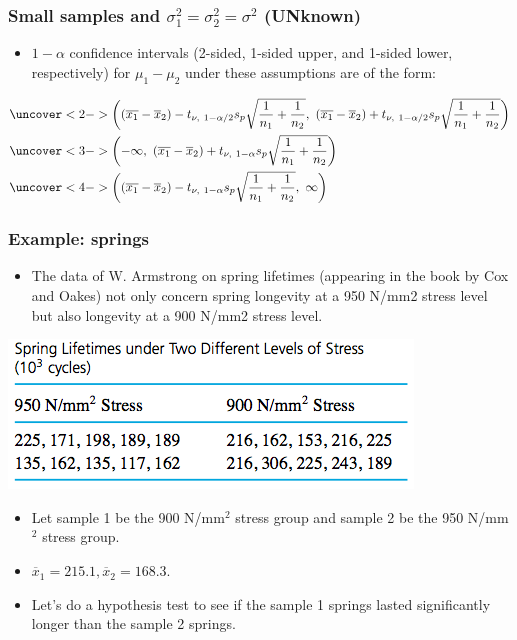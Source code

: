 \documentclass[handout]{beamer}\usepackage[]{graphicx}\usepackage[]{color}
\providecommand{\ov}[1]{\overline{#1}}
\numberwithin{equation}{section}
\begin{document}
\begin{frame}
\frametitle{Small samples and $\sigma^2_1 = \sigma^2_2 = \sigma^2$ (UNknown)} \scriptsize
\begin{itemize}
\item $1 - \alpha$ confidence intervals (2-sided, 1-sided upper, and 1-sided lower, respectively) for $\mu_1 - \mu_2$ under these assumptions are of the form: 
\end{itemize}
\begin{align*}
&\uncover<2->{\left ((\ov{x_1} - \ov{x}_2) - t_{\nu, \ 1 - \alpha/2} s_p \sqrt{\frac{1}{n_1} + \frac{1}{n_2}} , \ (\ov{x_1} - \ov{x}_2) + t_{\nu, \ 1 - \alpha/2} s_p \sqrt{\frac{1}{n_1} + \frac{1}{n_2}} \right )} \\
&\uncover<3->{\left (-\infty , \ (\ov{x_1} - \ov{x}_2) + t_{\nu, \ 1 - \alpha} s_p \sqrt{\frac{1}{n_1} + \frac{1}{n_2}} \right )} \\
&\uncover<4->{\left ((\ov{x_1} - \ov{x}_2) - t_{\nu, \ 1 - \alpha} s_p \sqrt{\frac{1}{n_1} + \frac{1}{n_2}}, \ \infty \right )}
\end{align*}
\end{frame}






\begin{frame}
\frametitle{Example: springs}
\begin{itemize}
\item The data of W. Armstrong on spring lifetimes (appearing in the book by Cox and Oakes) not only concern spring longevity at a 950 N/mm2 stress level but also longevity at a 900 N/mm2 stress level. 
\end{itemize}
\begin{center}
 \includegraphics{../../fig/springdata.png}
\end{center}
\begin{itemize}
\pause \item Let sample 1 be the 900 N/mm${}^2$ stress group and sample 2 be the 950 N/mm${}^2$ stress group.
\pause \item $\ov{x}_1 = 215.1, \ov{x}_2 = 168.3$.
\pause \item Let's do a hypothesis test to see if the sample 1 springs lasted significantly longer than the sample 2 springs.
\end{itemize}
\end{frame}
\end{document}

